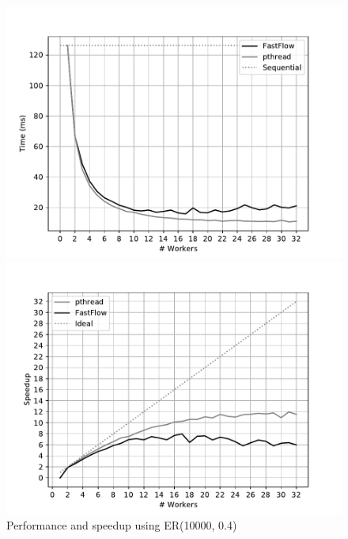 \begin{figure}[!htb]
\begin{minipage}{0.48\textwidth}
        \includegraphics[width=\textwidth]{plots/fastflow_performance_04_time.pdf}
    \end{minipage}
    \begin{minipage}{0.48\textwidth}
        \includegraphics[width=\textwidth]{plots/fastflow_speedup_04_time.pdf}
    \end{minipage}
    \begin{minipage}{1\textwidth}
    \caption{Performance and speedup using ER(10000, 0.4)}
    \label{fig:perf_04}
    \end{minipage}
    \centering
    \begin{minipage}{0.48\textwidth}

\end{minipage}
\end{figure}
